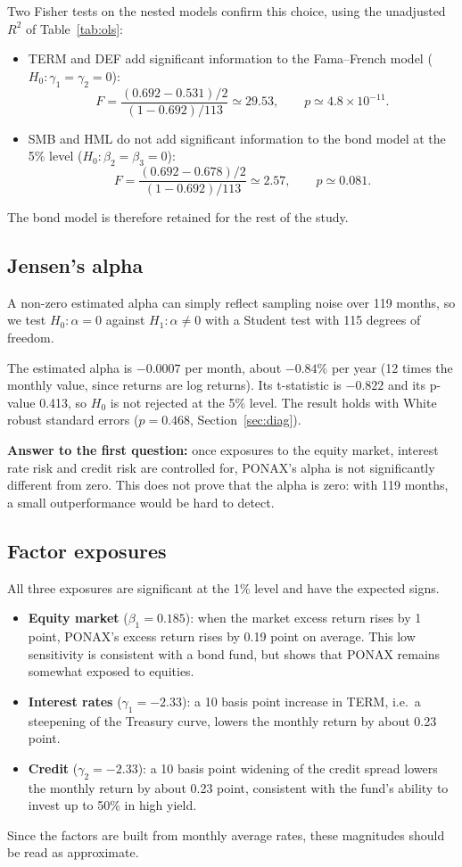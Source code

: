 \documentclass[11pt,a4paper]{article}
\begin{document}
Two Fisher tests on the nested models confirm this choice, using the unadjusted $R^2$ of Table~\ref{tab:ols}:
\begin{itemize}
\item TERM and DEF add significant information to the Fama--French model ($H_0: \gamma_1 = \gamma_2 = 0$):
\[
F = \frac{(0.692 - 0.531)/2}{(1 - 0.692)/113} \simeq 29.53, \qquad p \simeq 4.8 \times 10^{-11}.
\]
\item SMB and HML do not add significant information to the bond model at the 5\% level ($H_0: \beta_2 = \beta_3 = 0$):
\[
F = \frac{(0.692 - 0.678)/2}{(1 - 0.692)/113} \simeq 2.57, \qquad p \simeq 0.081.
\]
\end{itemize}

The bond model is therefore retained for the rest of the study.

\subsection{Jensen's alpha}

A non-zero estimated alpha can simply reflect sampling noise over 119 months, so we test $H_0: \alpha = 0$ against $H_1: \alpha \neq 0$ with a Student test with 115 degrees of freedom.

The estimated alpha is $-0.0007$ per month, about $-0.84\%$ per year (12 times the monthly value, since returns are log returns). Its t-statistic is $-0.822$ and its p-value 0.413, so $H_0$ is not rejected at the 5\% level. The result holds with White robust standard errors ($p = 0.468$, Section~\ref{sec:diag}).

\textbf{Answer to the first question:} once exposures to the equity market, interest rate risk and credit risk are controlled for, PONAX's alpha is not significantly different from zero. This does not prove that the alpha is zero: with 119 months, a small outperformance would be hard to detect.

\subsection{Factor exposures}

All three exposures are significant at the 1\% level and have the expected signs.
\begin{itemize}
\item \textbf{Equity market} ($\beta_1 = 0.185$): when the market excess return rises by 1 point, PONAX's excess return rises by 0.19 point on average. This low sensitivity is consistent with a bond fund, but shows that PONAX remains somewhat exposed to equities.
\item \textbf{Interest rates} ($\gamma_1 = -2.33$): a 10 basis point increase in TERM, i.e.\ a steepening of the Treasury curve, lowers the monthly return by about 0.23 point.
\item \textbf{Credit} ($\gamma_2 = -2.33$): a 10 basis point widening of the credit spread lowers the monthly return by about 0.23 point, consistent with the fund's ability to invest up to 50\% in high yield.
\end{itemize}
Since the factors are built from monthly average rates, these magnitudes should be read as approximate.
\end{document}

